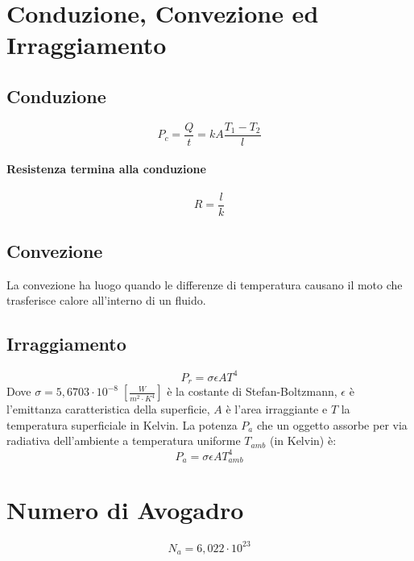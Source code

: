         \section*{Conduzione, Convezione ed Irraggiamento} 

            \subsection*{Conduzione}
                \begin{equation*}
                    P_c = \frac{Q}{t} = kA\frac{T_1 - T_2}{l}
                \end{equation*}

            \paragraph{Resistenza termina alla conduzione}
                \begin{equation*}
                    R = \frac{l}{k}
                \end{equation*}

            \subsection*{Convezione} La convezione ha luogo quando le differenze
            di temperatura causano il moto che trasferisce calore all'interno 
            di un fluido.

            \subsection*{Irraggiamento}
                \begin{equation*}
                    P_r = \sigma \epsilon AT^4
                \end{equation*}
            Dove $\sigma = 5,6703 \cdot 10^{-8} \; [\frac{W}{m^2 \cdot K^4}
            ]$ è la costante di Stefan-Boltzmann, $\epsilon$ è l'emittanza
            caratteristica della superficie, $A$ è l'area irraggiante e $T$ la 
            temperatura superficiale in Kelvin. La potenza $P_a$ che un oggetto
            assorbe per via radiativa dell'ambiente a temperatura uniforme
            $T_{amb}$ (in Kelvin) è:
                \begin{equation*}
                    P_a = \sigma \epsilon AT^4_{amb}
                \end{equation*}

    \section*{Numero di Avogadro}
        \begin{equation*}
            N_a = 6,022 \cdot 10^{23}
        \end{equation*}


